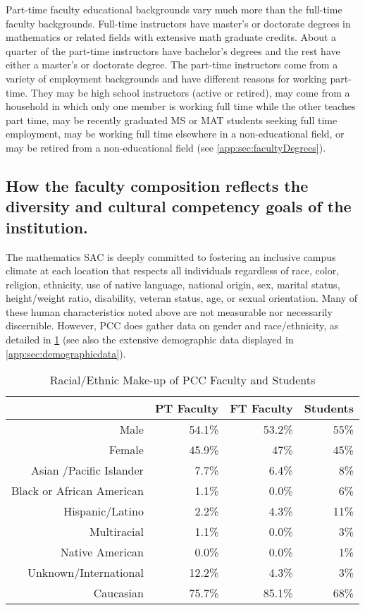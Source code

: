 Part-time faculty educational backgrounds vary much more than the full-time
faculty backgrounds.  Full-time instructors have master's or doctorate degrees
in mathematics or related fields with extensive math graduate credits.  About a
quarter of the part-time instructors have bachelor's degrees and the rest have
either a master's or doctorate degree.  The part-time instructors come from a
variety of employment backgrounds and have different reasons for working
part-time.  They may be high school instructors (active or retired), may come
from a household in which only one member is working full time while the other
teaches part time, may be recently graduated MS or MAT students seeking full
time employment, may be working full time elsewhere in a non-educational field,
or may be retired from a non-educational field (see
\vref{app:sec:facultyDegrees}).

\subsection[Faculty diversity]{How the faculty composition reflects the diversity and cultural
competency goals of the institution.}
The mathematics SAC is deeply committed to fostering an inclusive campus
climate at each location that respects all individuals regardless of race,
color, religion, ethnicity, use of native language, national origin, sex,
marital status, height/weight ratio, disability, veteran status, age, or sexual
orientation.  Many of these human characteristics noted above are not
measurable nor necessarily discernible.  However, PCC does gather data on
gender and race/ethnicity, as detailed in \cref{reflect:tab:racialethnicmakeup}
(see also the extensive demographic data displayed in
\vref{app:sec:demographicdata}).

\begin{table}[!htb]
  \centering
  \caption{Racial/Ethnic Make-up of PCC Faculty and Students}
  \label{reflect:tab:racialethnicmakeup}
  \begin{tabular}{rrrr}
    \toprule
            &PT Faculty &   FT Faculty  & Students\\
            \midrule
    Male    & 54.1\%    & 53.2\%     & 55\% \\
    Female  & 45.9\%    & 47\%       & 45\% \\
    Asian /Pacific Islander & 7.7\% &   6.4\%    & 8\%\\
    Black or African American &   1.1\%  &  0.0\% &   6\%\\
    Hispanic/Latino &  2.2\%   & 4.3\%  &  11\%\\
    Multiracial & 1.1\%  &  0.0\%  &  3\%\\
    Native American & 0.0\%  &  0.0\%  &  1\%\\
    Unknown/International   & 12.2\% &  4.3\% &    3\%\\
    Caucasian   & 75.7\%   & 85.1\%   & 68\%\\
    \bottomrule
  \end{tabular}
\end{table}

